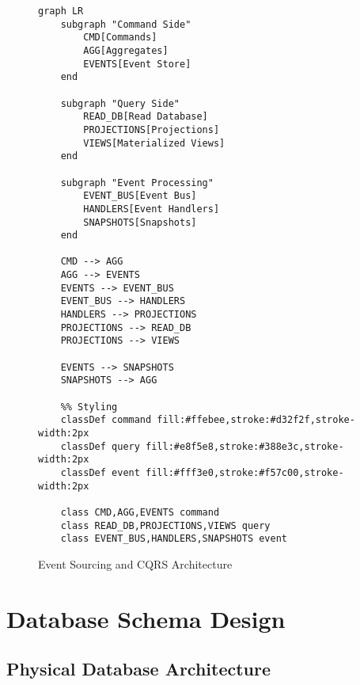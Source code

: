 \documentclass[12pt,a4paper]{article}
\begin{document}
\begin{figure}[H]
\centering
\begin{verbatim}
graph LR
    subgraph "Command Side"
        CMD[Commands]
        AGG[Aggregates]
        EVENTS[Event Store]
    end
    
    subgraph "Query Side"
        READ_DB[Read Database]
        PROJECTIONS[Projections]
        VIEWS[Materialized Views]
    end
    
    subgraph "Event Processing"
        EVENT_BUS[Event Bus]
        HANDLERS[Event Handlers]
        SNAPSHOTS[Snapshots]
    end
    
    CMD --> AGG
    AGG --> EVENTS
    EVENTS --> EVENT_BUS
    EVENT_BUS --> HANDLERS
    HANDLERS --> PROJECTIONS
    PROJECTIONS --> READ_DB
    PROJECTIONS --> VIEWS
    
    EVENTS --> SNAPSHOTS
    SNAPSHOTS --> AGG
    
    %% Styling
    classDef command fill:#ffebee,stroke:#d32f2f,stroke-width:2px
    classDef query fill:#e8f5e8,stroke:#388e3c,stroke-width:2px
    classDef event fill:#fff3e0,stroke:#f57c00,stroke-width:2px
    
    class CMD,AGG,EVENTS command
    class READ_DB,PROJECTIONS,VIEWS query
    class EVENT_BUS,HANDLERS,SNAPSHOTS event
\end{verbatim}
\caption{Event Sourcing and CQRS Architecture}
\end{figure}

\section{Database Schema Design}

\subsection{Physical Database Architecture}
\end{document}
